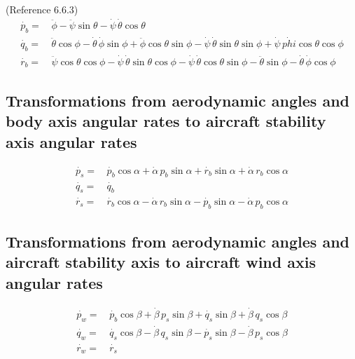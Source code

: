 \documentclass[
]{book}
\begin{document}
(Reference 6.6.3)
\begin{align}
\dot{p_b} =& \, \ddot{\phi} - \ddot{\psi}\sin\theta - \dot{\psi} \, \dot{\theta} \cos\theta  \\
\dot{q_b} =& \, \ddot{\theta} \cos\phi - \dot{\theta} \, \dot{\phi} \sin{\phi} + \ddot{\phi} \cos\theta \sin\phi - \dot{\psi} \, \dot{\theta} \sin\theta \sin\phi + \dot{\psi} \, \dot{phi} \cos\theta \cos\phi \\
\dot{r_b} =& \, \ddot{\psi} \cos\theta \cos\phi - \dot{\psi} \, \dot{\theta} \sin\theta \cos\phi - \dot{\psi} \, \dot{\theta} \cos\theta \sin\phi - \ddot{\theta} \sin\phi - \dot{\theta} \, \dot{\phi} \cos\phi
\end{align}

\hypertarget{transformations-from-aerodynamic-angles-and-body-axis-angular-rates-to-aircraft-stability-axis-angular-rates}{%
\subsection{Transformations from aerodynamic angles and body axis angular rates to aircraft stability axis angular rates}\label{transformations-from-aerodynamic-angles-and-body-axis-angular-rates-to-aircraft-stability-axis-angular-rates}}

\begin{align}
\dot{p_s} =& \, \dot{p_b} \cos\alpha + \dot{\alpha} \, p_b \sin\alpha + \dot{r_b}\sin\alpha + \dot{\alpha} \, r_b \cos\alpha  \\
\dot{q_s} =& \, \dot{q_b} \\
\dot{r_s} =& \, \dot{r_b} \cos\alpha - \dot{\alpha} \, r_b \sin\alpha - \dot{p_b}\sin\alpha - \dot{\alpha} \, p_b \cos\alpha
\end{align}

\hypertarget{transformations-from-aerodynamic-angles-and-aircraft-stability-axis-to-aircraft-wind-axis-angular-rates}{%
\subsection{Transformations from aerodynamic angles and aircraft stability axis to aircraft wind axis angular rates}\label{transformations-from-aerodynamic-angles-and-aircraft-stability-axis-to-aircraft-wind-axis-angular-rates}}

\begin{align}
\dot{p_w} =& \, \dot{p_b} \cos\beta + \dot{\beta} \, p_s \sin\beta + \dot{q_s}\sin\beta + \dot{\beta} \, q_s \cos\beta  \\
\dot{q_w} =& \,  \dot{q_s} \cos\beta - \dot{\beta} \, q_s \sin\beta - \dot{p_s} \sin\beta - \dot{\beta} \, p_s \cos\beta\\
\dot{r_w} =& \, \dot{r_s}
\end{align}
\end{document}
